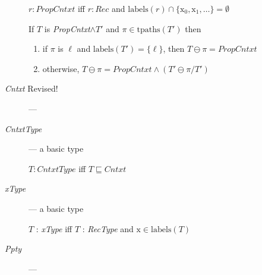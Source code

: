 \begin{description}
  $r:\textit{PropCntxt}$ iff
$r:\textit{Rec}$ and
$\mathrm{labels}(r)\cap\{\text{x}_0,\text{x}_1,\ldots\}=\emptyset$

\bigskip

If $T$ is \textit{PropCntxt}$\wedge T'$ and
  $\pi\in\mathrm{tpaths}(T')$ then
  \begin{enumerate}
    
  \item if $\pi$ is $\ell$ and $\mathrm{labels}(T')=\{\ell\}$, then $T\ominus\pi=\textit{PropCntxt}$
    
  \item otherwise, $T\ominus\pi= \textit{PropCntxt}\wedge(T'\ominus \pi/T')$
  \end{enumerate}

\item[\textnormal{\textit{Cntxt}} Revised!] --- 

        \item[\textnormal{\textit{CntxtType}}] --- a basic type

    $T:\textit{CntxtType}$ iff $T\sqsubseteq\textit{Cntxt}$
      

      
      
    \item[\textnormal{\textit{xType}}] --- a basic type

      $T$ : \textit{xType} iff $T$ : \textit{RecType} and $\text{x}\in\mathrm{labels}(T)$

      \item[\textnormal{\textit{Ppty}}] ---

        \begin{description}
        

\end{description}
\end{description}
